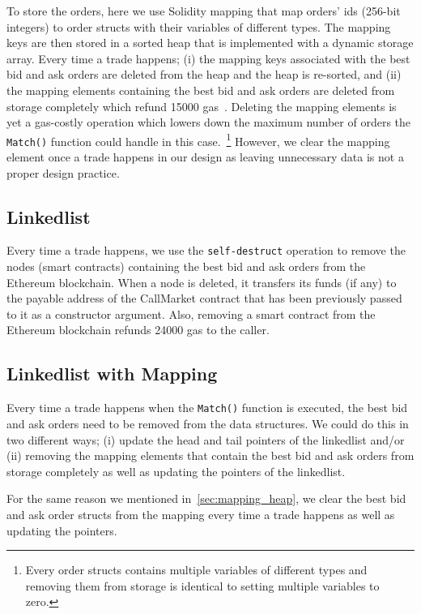 To store the orders, here we use Solidity mapping that map orders' ids (256-bit integers) to order structs with their variables of different types. The mapping keys are then stored in a sorted heap that is implemented with a dynamic storage array. Every time a trade happens; (i) the mapping keys associated with the best bid and ask orders are deleted from the heap and the heap is re-sorted, and (ii) the mapping elements containing the best bid and ask orders are deleted from storage completely which refund 15000 gas~\cite{wood2014ethereum}. Deleting the mapping elements is yet a gas-costly operation which lowers down the maximum number of orders the \texttt{Match()} function could handle in this case.~\footnote{Every order structs contains multiple variables of different types and removing them from storage is identical to setting multiple variables to zero.} However, we clear the mapping element once a trade happens in our design as leaving unnecessary data is not a proper design practice.

 
\subsection {Linkedlist}
Every time a trade happens, we use the \texttt{self-destruct} operation to remove the nodes (\ie smart contracts) containing the best bid and ask orders from the Ethereum blockchain. When a node is deleted, it transfers its funds (if any) to the payable address of the CallMarket contract that has been previously passed to it as a constructor argument. Also, removing a smart contract from the Ethereum blockchain refunds 24000 gas to the caller.


\subsection {Linkedlist with Mapping}
Every time a trade happens when the \texttt{Match()} function is executed, the best bid and ask orders need to be removed from the data structures. We could do this in two different ways; (i) update the head and tail pointers of the linkedlist and/or (ii) removing the mapping elements that contain the best bid and ask orders from storage completely as well as updating the pointers of the linkedlist. \par

For the same reason we mentioned in~\ref{sec:mapping_heap}, we clear the best bid and ask order structs from the mapping every time a trade happens as well as updating the pointers.



